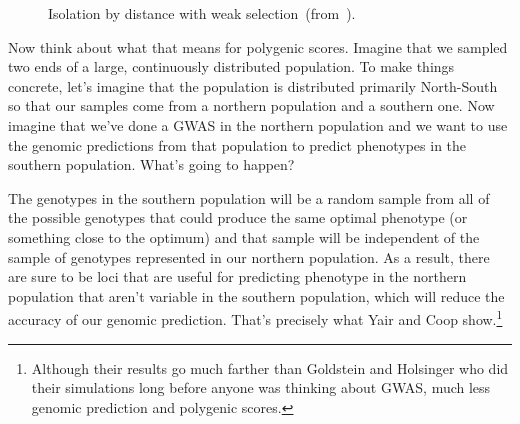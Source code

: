 \begin{figure}
\begin{center}
\end{center}
\caption{Isolation by distance with weak
  selection~(from~\cite{Goldstein-Holsinger-1992}).}\label{fig:isolation-by-distance}
\end{figure}

Now think about what that means for polygenic scores. Imagine that we
sampled two ends of a large, continuously distributed population. To
make things concrete, let's imagine that the population is distributed
primarily North-South so that our samples come from a northern
population and a southern one. Now imagine that we've done a GWAS in
the northern population and we want to use the genomic predictions
from that population to predict phenotypes in the southern
population. What's going to happen?

The genotypes in the southern population will be a random sample from
all of the possible genotypes that could produce the same optimal
phenotype (or something close to the optimum) and that sample will be
independent of the sample of genotypes represented in our northern
population. As a result, there are sure to be loci that are useful for
predicting phenotype in the northern population that aren't variable
in the southern population, which will reduce the accuracy of our
genomic prediction. That's precisely what Yair and Coop
show.\footnote{Although their results go much farther than Goldstein
  and Holsinger who did their simulations long before anyone was
  thinking about GWAS, much less genomic prediction and polygenic
  scores.}

